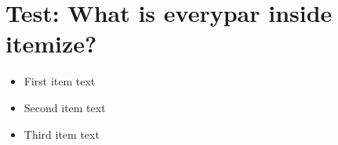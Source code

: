 \documentclass[11pt,a4paper]{article}
\begin{document}
\section{Test: What is everypar inside itemize?}


\begin{itemize}
  \item First item text
  \item Second item text
  \item Third item text
\end{itemize}

\end{document}
